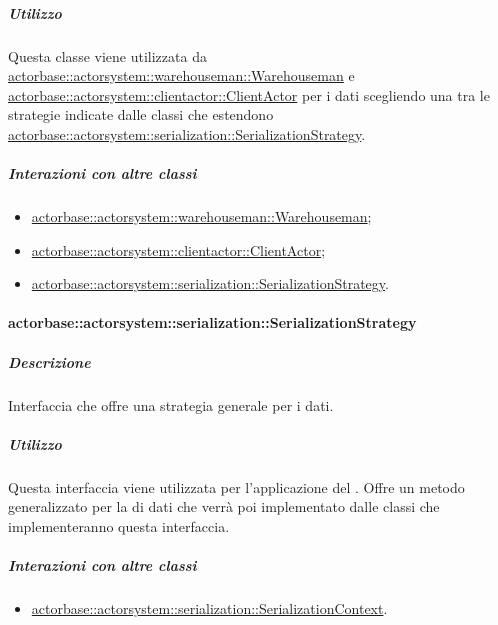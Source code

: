 \documentclass{scalatekids-article}
\begin{document}
\subparagraph{Utilizzo}

Questa classe viene utilizzata da \hyperref[sec:actorbase::actorsystem::warehouseman::Warehouseman]{actorbase::\allowbreak{}actorsystem::\allowbreak{}warehouseman::\allowbreak{}Warehouseman}
e \hyperref[sec:actorbase::actorsystem::clientactor::ClientActor]{actorbase::\allowbreak{}actorsystem::\allowbreak{}clientactor::\allowbreak{}ClientActor}
per  i dati scegliendo una tra le strategie indicate
dalle classi che estendono \hyperref[sec:actorbase::actorsystem::serialization::SerializationStrategy]{actorbase::\allowbreak{}actorsystem::\allowbreak{}serialization::\allowbreak{}SerializationStrategy}.

\subparagraph{Interazioni con altre classi}

\begin{itemize}

\item \hyperref[sec:actorbase::actorsystem::warehouseman::Warehouseman]{actorbase::actorsystem::warehouseman::Warehouseman};
\item \hyperref[sec:actorbase::actorsystem::clientactor::ClientActor]{actorbase::actorsystem::clientactor::ClientActor};
\item \hyperref[sec:actorbase::actorsystem::serialization::SerializationStrategy]{actorbase::actorsystem::serialization::SerializationStrategy}.

\end{itemize}

\paragraph{actorbase::actorsystem::serialization::SerializationStrategy}
\label{sec:actorbase::actorsystem::serialization::SerializationStrategy}

\subparagraph{Descrizione}

Interfaccia che offre una strategia generale per  i dati.

\subparagraph{Utilizzo}

Questa interfaccia viene utilizzata per l'applicazione del 
. Offre un metodo generalizzato per la
 di dati che verrà poi implementato dalle classi che
implementeranno questa interfaccia.

\subparagraph{Interazioni con altre classi}

\begin{itemize}

\item \hyperref[sec:actorbase::actorsystem::serialization::SerializationContext]{actorbase::actorsystem::serialization::SerializationContext}.

\end{itemize}
\end{document}

